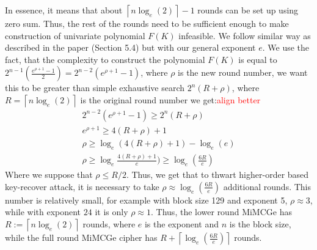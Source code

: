 \documentclass{Resources/UoBLab1}
\theoremstyle{definition}
\begin{document}
In essence, it means that about \(\left\lceil n\log_e(2) \right\rceil - 1\) rounds can be set up using zero sum. Thus, the rest of the rounds need to be sufficient enough to make construction of univariate polynomial $F(K)$ infeasible. We follow similar way as described in the paper (Section 5.4\cite{MiMCAttack}) but with our general exponent $e$. We use the fact, that the complexity to construct the polynomial $F(K)$ is equal to \(2^{n-1}(\frac{e^{\rho + 1}-1}{2}) = 2^{n-2}(e^{\rho + 1}-1)\), where $\rho$ is the new round number, we want this to be greater than simple exhaustive search \(2^n(R+\rho)\), where \(R = \left\lceil n\log_e(2) \right\rceil \) is the original round number we get:\textcolor{red}{align better}
\begin{gather*}
    2^{n-2}(e^{\rho + 1}-1) \ge 2^n(R +\rho)\\
    e^{\rho + 1} \ge 4(R +\rho) + 1\\
    \rho \ge \log_e(4(R+\rho) + 1) - \log_e(e)\\
    \rho \ge \log_e\frac{4(R+\rho) + 1}{e}) \ge \log_e(\frac{6R}{e})
\end{gather*}
Where we suppose that \(\rho \le R/2\). Thus, we get that to thwart higher-order based key-recover attack, it is necessary to take \(\rho \approx \log_e(\frac{6R}{e})\) additional rounds. This number is relatively small, for example with block size 129 and exponent 5, $\rho \approx 3$, while with exponent $24$ it is only $\rho \approx 1$. Thus, the lower round MiMCGe has \(R := \left\lceil n\log_e(2) \right\rceil\) rounds, where $e$ is the exponent and $n$ is the block size, while the full round MiMCGe cipher has \(R + \left\lceil \log_e(\frac{6R}{e}) \right\rceil\) rounds.
\end{document}
